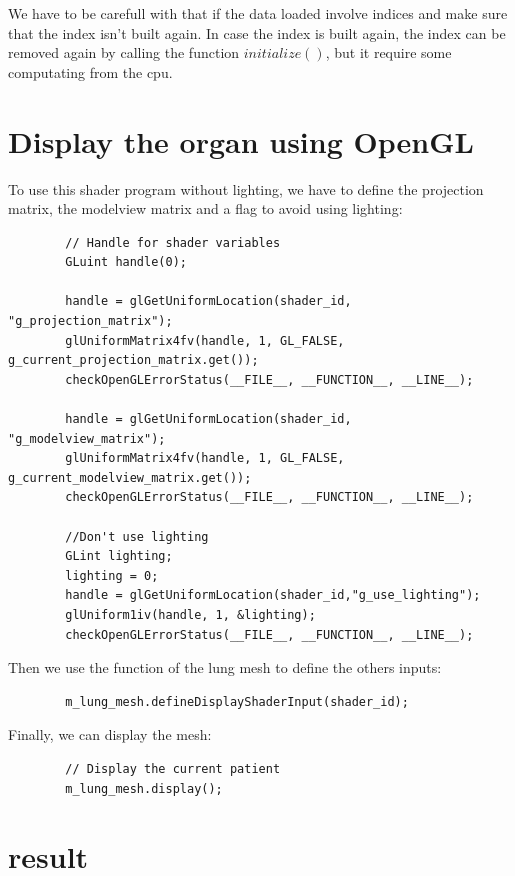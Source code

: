 \documentclass[12pt]{report}
\begin{document}
	We have to be carefull with that if the data loaded involve indices and make sure that the index isn't built again. In case the index is built again, the index can be removed again by calling the function $initialize()$, but it require some computating from the cpu.

\chapter{Display the organ using OpenGL}

To use this shader program without lighting, we have to define the projection matrix, the modelview matrix and a flag to avoid using lighting:

\begin{lstlisting}
        // Handle for shader variables
    	GLuint handle(0);

    	handle = glGetUniformLocation(shader_id, "g_projection_matrix");
        glUniformMatrix4fv(handle, 1, GL_FALSE, g_current_projection_matrix.get());
        checkOpenGLErrorStatus(__FILE__, __FUNCTION__, __LINE__);

        handle = glGetUniformLocation(shader_id, "g_modelview_matrix");
        glUniformMatrix4fv(handle, 1, GL_FALSE, g_current_modelview_matrix.get());
        checkOpenGLErrorStatus(__FILE__, __FUNCTION__, __LINE__);

        //Don't use lighting
        GLint lighting;
        lighting = 0;
        handle = glGetUniformLocation(shader_id,"g_use_lighting");
        glUniform1iv(handle, 1, &lighting);
        checkOpenGLErrorStatus(__FILE__, __FUNCTION__, __LINE__);
\end{lstlisting}

Then we use the function of the lung mesh to define the others inputs:

\begin{lstlisting}
        m_lung_mesh.defineDisplayShaderInput(shader_id);
\end{lstlisting}

Finally, we can display the mesh:

\begin{lstlisting}
        // Display the current patient
   		m_lung_mesh.display();
\end{lstlisting}

\chapter{result}
\end{document}
